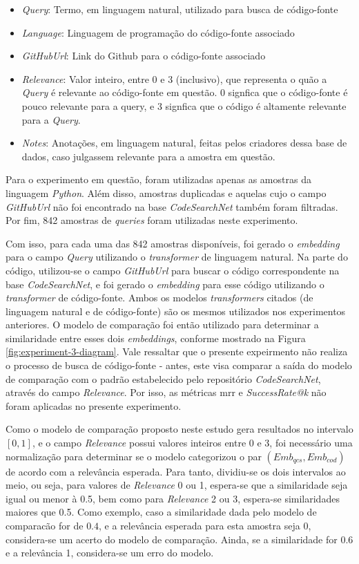 \begin{itemize}
    \item \textit{Query}: Termo, em linguagem natural, utilizado para busca de código-fonte
    \item \textit{Language}: Linguagem de programação do código-fonte associado
    \item \textit{GitHubUrl}: Link do Github para o código-fonte associado
    \item \textit{Relevance}: Valor inteiro, entre 0 e 3 (inclusivo), que representa o quão a \textit{Query} é relevante ao código-fonte em questão. 0 signfica que o código-fonte é pouco relevante para a query, e 3 signfica que o código é altamente relevante para a \textit{Query}.
    \item \textit{Notes}: Anotações, em linguagem natural, feitas pelos criadores dessa base de dados, caso julgassem relevante para a amostra em questão.
\end{itemize}

Para o experimento em questão, foram utilizadas apenas as amostras da linguagem \textit{Python}. Além disso, amostras duplicadas e aquelas cujo o campo \textit{GitHubUrl} não foi encontrado na base \textit{CodeSearchNet} também foram filtradas. Por fim, 842 amostras de \textit{queries} foram utilizadas neste experimento. 

Com isso, para cada uma das 842 amostras disponíveis, foi gerado o \textit{embedding} para o campo \textit{Query} utilizando o \textit{transformer} de linguagem natural. Na parte do código, utilizou-se o campo \textit{GitHubUrl} para buscar o código correspondente na base \textit{CodeSearchNet}, e foi gerado o \textit{embedding} para esse código utilizando o \textit{transformer} de código-fonte. Ambos os modelos \textit{transformers} citados (de linguagem natural e de código-fonte) são os mesmos utilizados nos experimentos anteriores. O modelo de comparação foi então utilizado para determinar a similaridade entre esses dois \textit{embeddings}, conforme mostrado na Figura \ref{fig:experiment-3-diagram}. Vale ressaltar que o presente expeirmento não realiza o processo de busca de código-fonte - antes, este visa comparar a saída do modelo de comparação com o padrão estabelecido pelo repositório \textit{CodeSearchNet}, através do campo \textit{Relevance}. Por isso, as métricas \gls{mrr} e \textit{SuccessRate@k} não foram aplicadas no presente experimento.

Como o modelo de comparação proposto neste estudo gera resultados no intervalo $[0, 1]$, e o campo \textit{Relevance} possui valores inteiros entre 0 e 3, foi necessário uma normalização para determinar se o modelo categorizou o par $(Emb_{qcs}, Emb_{cod})$ de acordo com a relevância esperada. Para tanto, dividiu-se os dois intervalos ao meio, ou seja, para valores de \textit{Relevance} 0 ou 1, espera-se que a similaridade seja igual ou menor à 0.5, bem como para \textit{Relevance} 2 ou 3, espera-se similaridades maiores que 0.5. Como exemplo, caso a similaridade dada pelo modelo de comparacão for de $0.4$, e a relevância esperada para esta amostra seja 0, considera-se um acerto do modelo de comparação. Ainda, se a similaridade for $0.6$ e a relevância 1, considera-se um erro do modelo.

